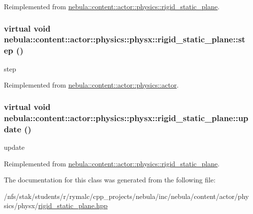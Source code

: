 Reimplemented from \hyperlink{classnebula_1_1content_1_1actor_1_1physics_1_1rigid__static__plane_a2ccd43a02a417f4690bc9174e4bf533a}{nebula::content::actor::physics::rigid\_\-static\_\-plane}.\hypertarget{classnebula_1_1content_1_1actor_1_1physics_1_1physx_1_1rigid__static__plane_a8d804808a0611348c62a6478f9faff12}{
\subsubsection[{step}]{\setlength{\rightskip}{0pt plus 5cm}virtual void nebula::content::actor::physics::physx::rigid\_\-static\_\-plane::step ()}}
\label{classnebula_1_1content_1_1actor_1_1physics_1_1physx_1_1rigid__static__plane_a8d804808a0611348c62a6478f9faff12}


step 

Reimplemented from \hyperlink{classnebula_1_1content_1_1actor_1_1physics_1_1actor_a0f97a976e76248d8072fcb9508353f16}{nebula::content::actor::physics::actor}.\hypertarget{classnebula_1_1content_1_1actor_1_1physics_1_1physx_1_1rigid__static__plane_a1f3ad3d71a0828a841901a7e69cbbe97}{
\subsubsection[{update}]{\setlength{\rightskip}{0pt plus 5cm}virtual void nebula::content::actor::physics::physx::rigid\_\-static\_\-plane::update ()}}
\label{classnebula_1_1content_1_1actor_1_1physics_1_1physx_1_1rigid__static__plane_a1f3ad3d71a0828a841901a7e69cbbe97}


update 

Reimplemented from \hyperlink{classnebula_1_1content_1_1actor_1_1physics_1_1rigid__static__plane_ab42f682ba60457dc596613690b57517e}{nebula::content::actor::physics::rigid\_\-static\_\-plane}.

The documentation for this class was generated from the following file:\begin{DoxyCompactItemize}
\item 
/nfs/stak/students/r/rymalc/cpp\_\-projects/nebula/inc/nebula/content/actor/physics/physx/\hyperlink{physics_2physx_2rigid__static__plane_8hpp}{rigid\_\-static\_\-plane.hpp}\end{DoxyCompactItemize}
